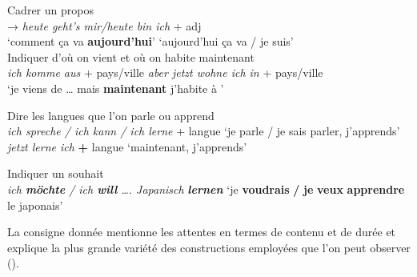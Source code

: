 \documentclass[output=paper]{langscibook}
\begin{document}
\begin{otherlanguage}{french}
\ea \label{ex:felce:fromtab:7}
  \ea Cadrer un propos\\
        {→}  {\textit{heute geht’s mir\slash heute bin ich} + adj}\\
  {`comment ça va \textbf{aujourd’hui}'}    {}        {`aujourd’hui ça va / je suis'}\\

  \ex Indiquer d’où on vient et où on habite maintenant\\
  \textit{ich komme aus} + pays/ville \textit{aber jetzt wohne ich in} + pays/ville\\\relax
  `je viens de … mais \textbf{maintenant} j’habite à '

  \ex Dire les langues que l’on parle ou apprend\\
  \textit{ich spreche / ich kann / ich lerne} + langue `je parle / je sais parler, j’apprends'\\
  \textit{jetzt lerne ich} \textbf{+} langue `maintenant, j’apprends'

  \ex Indiquer un souhait\\
  \textit{ich \textbf{möchte} / ich \textbf{will}} \textit{…. Japanisch} \textbf{\textit{lernen}} `je \textbf{voudrais} \textbf{/} \textbf{je} \textbf{veux} \textbf{apprendre} le japonais'
  \z
\z
 

La consigne donnée mentionne les attentes en termes de contenu et de durée et explique la plus grande variété des constructions employées que l’on peut observer ().


\end{otherlanguage}
\end{document}
